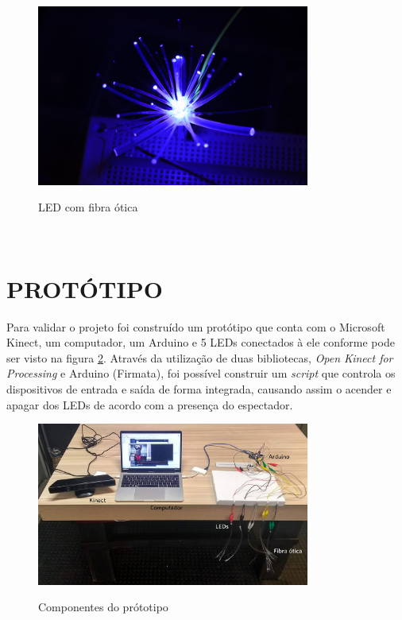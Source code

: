 \begin{figure}[H]
    \centering
    \caption{LED com fibra ótica}
	\vspace*{0,2cm}
    \includegraphics[width=0.8\textwidth]{./04-figuras/led_fibra_otica}
    \label{fig:led_fibra_otica}
\end{figure}
\vspace*{-0,9cm}
{\raggedright {}}\\


\section{PROTÓTIPO}

Para validar o projeto foi construído um protótipo que conta com o Microsoft Kinect, um computador, um Arduino e 5 LEDs conectados à ele conforme pode ser visto na figura \ref{fig:prototipo}. Através da utilização de duas bibliotecas, \textit{Open Kinect for Processing} e Arduino (Firmata), foi possível construir um \textit{script} que controla os dispositivos de entrada e saída de forma integrada, causando assim o acender e apagar dos LEDs de acordo com a presença do espectador.

\begin{figure}[H]
    \centering
    \caption{Componentes do prótotipo}
	\vspace*{0,2cm}
    \includegraphics[width=0.8\textwidth]{./04-figuras/prototipo}
    \label{fig:prototipo}
\end{figure}
\vspace*{-0,9cm}
{\raggedright {}}\\

